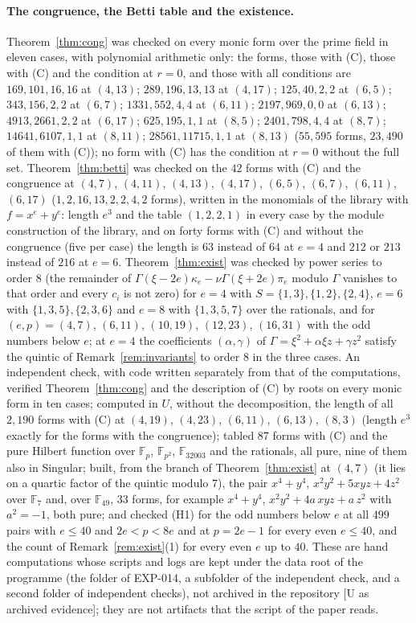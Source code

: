 \documentclass[11pt]{article}
\theoremstyle{definition}
\theoremstyle{remark}
\newcommand{\EXP}[1]{\mbox{EXP-#1}}
\newcommand{\F}{\mathbb{F}}
\begin{document}
\paragraph{The congruence, the Betti table and the existence.} Theorem~\ref{thm:cong} was checked on every monic form over the prime field in eleven cases, with polynomial arithmetic only: the forms, those with (C), those with (C) and the condition at $r=0$, and those with all conditions are $169,101,16,16$ at $(4,13)$; $289,196,13,13$ at $(4,17)$; $125,40,2,2$ at $(6,5)$; $343,156,2,2$ at $(6,7)$; $1331,552,4,4$ at $(6,11)$; $2197,969,0,0$ at $(6,13)$; $4913,2661,2,2$ at $(6,17)$; $625,195,1,1$ at $(8,5)$; $2401,798,4,4$ at $(8,7)$; $14641,6107,1,1$ at $(8,11)$; $28561,11715,1,1$ at $(8,13)$ ($55{,}595$ forms, $23{,}490$ of them with (C)); no form with (C) has the condition at $r=0$ without the full set. Theorem~\ref{thm:betti} was checked on the $42$ forms with (C) and the congruence at $(4,7)$, $(4,11)$, $(4,13)$, $(4,17)$, $(6,5)$, $(6,7)$, $(6,11)$, $(6,17)$ ($1,2,16,13,2,2,4,2$ forms), written in the monomials of the library with $f=x^e+y^e$: length $e^3$ and the table $(1,2,2,1)$ in every case by the module construction of the library, and on forty forms with (C) and without the congruence (five per case) the length is $63$ instead of $64$ at $e=4$ and $212$ or $213$ instead of $216$ at $e=6$. Theorem~\ref{thm:exist} was checked by power series to order $8$ (the remainder of $\Gamma(\xi-2e)\kappa_e-\nu\Gamma(\xi+2e)\pi_e$ modulo $\Gamma$ vanishes to that order and every $c_i$ is not zero) for $e=4$ with $S=\{1,3\},\{1,2\},\{2,4\}$, $e=6$ with $\{1,3,5\},\{2,3,6\}$ and $e=8$ with $\{1,3,5,7\}$ over the rationals, and for $(e,p)=(4,7)$, $(6,11)$, $(10,19)$, $(12,23)$, $(16,31)$ with the odd numbers below $e$; at $e=4$ the coefficients $(\alpha,\gamma)$ of $\Gamma=\xi^2+\alpha\xi z+\gamma z^2$ satisfy the quintic of Remark~\ref{rem:invariants} to order $8$ in the three cases. An independent check, with code written separately from that of the computations, verified Theorem~\ref{thm:cong} and the description of (C) by roots on every monic form in ten cases; computed in $U$, without the decomposition, the length of all $2{,}190$ forms with (C) at $(4,19)$, $(4,23)$, $(6,11)$, $(6,13)$, $(8,3)$ (length $e^3$ exactly for the forms with the congruence); tabled $87$ forms with (C) and the pure Hilbert function over $\F_p$, $\F_{p^2}$, $\F_{32003}$ and the rationals, all pure, nine of them also in Singular; built, from the branch of Theorem~\ref{thm:exist} at $(4,7)$ (it lies on a quartic factor of the quintic modulo $7$), the pair $x^4+y^4$, $x^2y^2+5xyz+4z^2$ over $\F_7$ and, over $\F_{49}$, $33$ forms, for example $x^4+y^4$, $x^2y^2+4a\,xyz+a\,z^2$ with $a^2=-1$, both pure; and checked (H1) for the odd numbers below $e$ at all $499$ pairs with $e\le40$ and $2e<p<8e$ and at $p=2e-1$ for every even $e\le40$, and the count of Remark~\ref{rem:exist}(1) for every even $e$ up to $40$. These are hand computations whose scripts and logs are kept under the data root of the programme (the folder of \EXP{014}, a subfolder of the independent check, and a second folder of independent checks), not archived in the repository [U as archived evidence]; they are not artifacts that the script of the paper reads.
\end{document}
